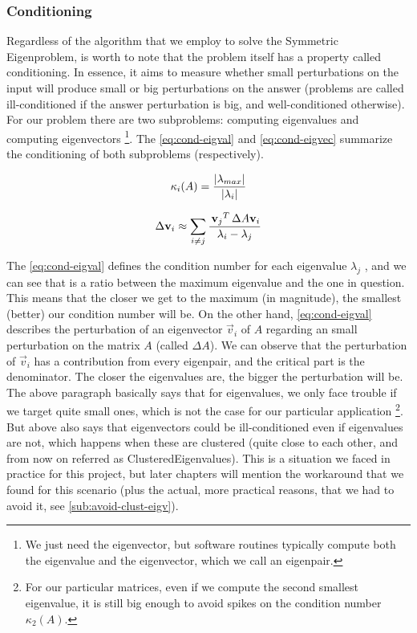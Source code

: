 \subsubsection{Conditioning}
Regardless of the algorithm that we employ to solve the Symmetric
Eigenproblem, is worth to note that the problem itself has a property
called conditioning. In essence, it aims to measure whether small
perturbations on the input will produce small or big perturbations on the
answer (problems are called ill-conditioned if the answer perturbation
is big, and well-conditioned otherwise). For our problem there are two subproblems:
computing eigenvalues and computing eigenvectors \footnote{We
just need the eigenvector, but software routines typically compute both the
eigenvalue and the eigenvector, which we call an eigenpair.}. The
\cref{eq:cond-eigval} and \cref{eq:cond-eigvec} summarize the
conditioning of both subproblems (respectively).

\begin{equation}
  \label{eq:cond-eigval}
  \kappa_{i}(A) = \dfrac{\left\lvert \lambda_{max} \right\vert}{\left\lvert \lambda_i \right\vert}
\end{equation}

\begin{equation}
  \label{eq:cond-eigvec}
  \Delta \mathbf{v}_i \approx \sum\limits_{\tiny{i \ne j}}
  \dfrac{\,{\mathbf{v}_j}^{T}\, \Delta A \mathbf{v}_i}{\lambda_i - \lambda_j}  
\end{equation}
\joinbelow{1cm}

The \cref{eq:cond-eigval} defines the condition number for each
eigenvalue $\lambda_j$ , and we can see that is a ratio between the maximum
eigenvalue and the one in question. This means that the closer we get
to the maximum (in magnitude), the smallest (better) our condition number will be. On
the other hand, \cref{eq:cond-eigval} describes the perturbation of an
eigenvector $\vec{v}_i$ of $A$ regarding an small perturbation on the
matrix $A$ (called $\Delta A$). We can observe that the perturbation of
$\vec{v}_i$ has a 
contribution from every eigenpair, and the critical part is the
denominator. The closer the eigenvalues are, the bigger the
perturbation will be. \\

The above paragraph basically says that for eigenvalues, we only face
trouble if we target quite small ones, which is not the case for our
particular application \footnote{For our particular matrices, even if
  we compute the
  second smallest eigenvalue, it is still big enough to avoid spikes
  on the condition 
number $\kappa_{2}(A)$.}. But above also says that
eigenvectors could be ill-conditioned even if eigenvalues are not,
which happens when these are clustered (quite close to each
other, and from now on referred as \gls{ClusteredEigenvalues}). This
is a situation we faced in practice for this project, but 
later chapters will mention the workaround that we found for this
scenario (plus the actual, more practical reasons, that we had to avoid
it, see \cref{sub:avoid-clust-eigv}). 

